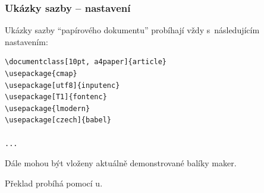 \begin{frame}
	\frametitle{Ukázky sazby -- nastavení}
	Ukázky sazby \enquote{papírového dokumentu} probíhají vždy s~následujícím nastavením:\par
	\begin{BVerbatim}
\documentclass[10pt, a4paper]{article}
\usepackage{cmap}
\usepackage[utf8]{inputenc}
\usepackage[T1]{fontenc}
\usepackage{lmodern}
\usepackage[czech]{babel}

...

	\end{BVerbatim}
	\par
	 Dále mohou být vloženy aktuálně demonstrované balíky maker.\par
	 Překlad probíhá pomocí u.
\end{frame}

\endinput
